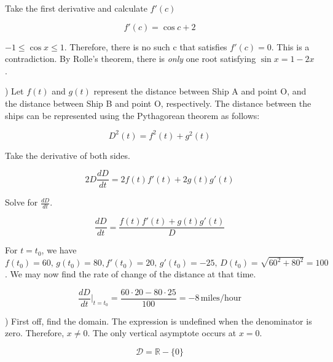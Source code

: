 \documentclass{article}
\begin{document}
\hfill

\noindent Take the first derivative and calculate $f'(c)$

\begin{equation*}
f'(c) = \cos c + 2
\end{equation*}

\hfill

\noindent $-1 \leq \cos x \leq 1$. Therefore, there is no such c that satisfies $f'(c) = 0$. This is a contradiction. By Rolle's theorem, there is \textit{only} one root satisfying $\sin x = 1-2x$.

) Let $f(t)$ and $g(t)$ represent the distance between Ship A and point O, and the distance between Ship B and point O, respectively. The distance between the ships can be represented using the Pythagorean theorem as follows:

\begin{equation*}
D^2(t) = f^2(t) + g^2(t)
\end{equation*}

\hfill

\noindent Take the derivative of both sides.

\begin{equation*}
2D\frac{dD}{dt} = 2f(t)f'(t) + 2g(t)g'(t)
\end{equation*}

\hfill

\noindent Solve for $\displaystyle \frac{dD}{dt}$.

\begin{equation*}
\frac{dD}{dt} = \frac{f(t)f'(t) + g(t)g'(t)}{\displaystyle D}
\end{equation*}

\hfill

\noindent For $t=t_0$, we have $f(t_0) = 60, \, g(t_0) = 80, f'(t_0) = 20, \, g'(t_0) =-25, \,D(t_0) = \sqrt{60^2 + 80^2} = 100$. We may now find the rate of change of the distance at that time.

\begin{equation*}
\frac{dD}{dt}\Bigg|_{t=t_0} = \frac{60\cdot 20 -80 \cdot 25}{\displaystyle 100} = \boxed{-8 \, \text{miles/hour}}
\end{equation*}

\hfill

) First off, find the domain. The expression is undefined when the denominator is zero. Therefore, $x\neq 0$. The only vertical asymptote occurs at $x = 0$.

\begin{equation*}\mathcal{D} = \mathbb{R} - \{0\} \end{equation*}
\end{document}
